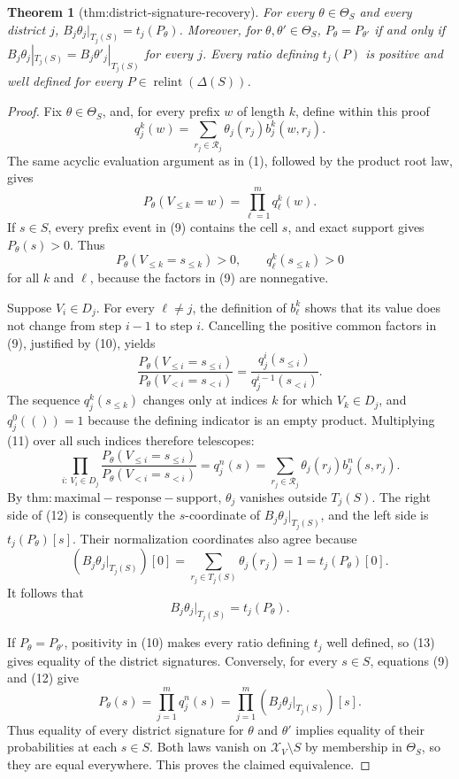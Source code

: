 \documentclass{article}
\newtheorem{theorem}{Theorem}
\begin{document}
\begin{theorem}[thm:district-signature-recovery]\label{thm:district-signature-recovery}
For every \(\theta\in\Theta_S\) and every district \(j\), \(B_j\theta_j|_{T_j(S)}=t_j(P_{\theta})\). Moreover, for \(\theta,\theta'\in\Theta_S\), \(P_{\theta}=P_{\theta'}\) if and only if \(B_j\theta_j|_{T_j(S)}=B_j\theta'_j|_{T_j(S)}\) for every \(j\). Every ratio defining \(t_j(P)\) is positive and well defined for every \(P\in\operatorname{relint}(\Delta(S))\).
\end{theorem}
\begin{proof}
Fix \(\theta\in\Theta_S\), and, for every prefix \(w\) of length \(k\), define within this proof
\[
q_j^k(w)=\sum_{r_j\in\mathcal R_j}\theta_j(r_j)b_j^k(w,r_j).
\]
The same acyclic evaluation argument as in (1), followed by the product root law, gives
\[
P_\theta(V_{\le k}=w)=\prod_{\ell=1}^m q_\ell^k(w).          \tag{9}
\]
If \(s\in S\), every prefix event in (9) contains the cell \(s\), and exact support gives \(P_\theta(s)>0\).  Thus
\[
P_\theta(V_{\le k}=s_{\le k})>0,
\qquad
q_\ell^k(s_{\le k})>0                                       \tag{10}
\]
for all \(k\) and \(\ell\), because the factors in (9) are nonnegative.

Suppose \(V_i\in D_j\).  For every \(\ell\ne j\), the definition of \(b_\ell^k\) shows that its value does not change from step \(i-1\) to step \(i\).  Cancelling the positive common factors in (9), justified by (10), yields
\[
\frac{P_\theta(V_{\le i}=s_{\le i})}
     {P_\theta(V_{<i}=s_{<i})}
=\frac{q_j^i(s_{\le i})}{q_j^{i-1}(s_{<i})}.                 \tag{11}
\]
The sequence \(q_j^k(s_{\le k})\) changes only at indices \(k\) for which \(V_k\in D_j\), and \(q_j^0(())=1\) because the defining indicator is an empty product.  Multiplying (11) over all such indices therefore telescopes:
\[
\prod_{i:\,V_i\in D_j}
\frac{P_\theta(V_{\le i}=s_{\le i})}
     {P_\theta(V_{<i}=s_{<i})}
=q_j^n(s)
=\sum_{r_j\in\mathcal R_j}\theta_j(r_j)b_j^n(s,r_j).        \tag{12}
\]
By \(\mathrm{thm:maximal-response-support}\), \(\theta_j\) vanishes outside \(T_j(S)\).  The right side of (12) is consequently the \(s\)-coordinate of \(B_j\theta_j|_{T_j(S)}\), and the left side is \(t_j(P_\theta)[s]\).  Their normalization coordinates also agree because
\[
(B_j\theta_j|_{T_j(S)})[0]
=\sum_{r_j\in T_j(S)}\theta_j(r_j)=1=t_j(P_\theta)[0].
\]
It follows that
\[
B_j\theta_j|_{T_j(S)}=t_j(P_\theta).                          \tag{13}
\]

If \(P_\theta=P_{\theta'}\), positivity in (10) makes every ratio defining \(t_j\) well defined, so (13) gives equality of the district signatures.  Conversely, for every \(s\in S\), equations (9) and (12) give
\[
P_\theta(s)=\prod_{j=1}^m q_j^n(s)
=\prod_{j=1}^m(B_j\theta_j|_{T_j(S)})[s].                    \tag{14}
\]
Thus equality of every district signature for \(\theta\) and \(\theta'\) implies equality of their probabilities at each \(s\in S\).  Both laws vanish on \(\mathcal X_V\setminus S\) by membership in \(\Theta_S\), so they are equal everywhere.  This proves the claimed equivalence.


\end{proof}
\end{document}
